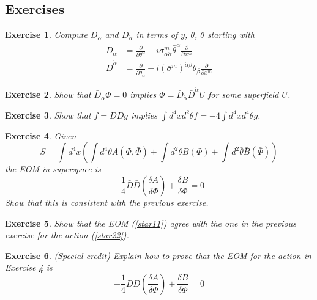 \documentclass[a4paper,12pt]{article}
\newtheorem{exe}{Exercise}
\numberwithin{equation}{section}
\numberwithin{exe}{section}
\newcommand{\p}{{\partial}}
\newcommand{\Db}{{\bar D}}
\renewcommand{\a}{{\alpha}}
\newcommand{\ad}{{\dot\alpha}}
\renewcommand{\b}{{\beta}}
\renewcommand{\d}{{\delta}}
\newcommand{\s}{{\sigma}}
\renewcommand{\sb}{{\bar\sigma}}
\renewcommand{\t}{{\theta}}
\newcommand{\tb}{{\bar\theta}}
\newcommand{\Phib}{{\bar \Phi}}
\begin{document}
\subsection{Exercises}

	\begin{exe}
	Compute $D_\a$ and $\bar D_\ad$ in terms of $y$, $\t$, $\tb$ starting with
		\begin{align}
		D_\a & = \frac{\p}{\p\t^\a} + i \s^m_{\a\ad} \tb^\ad \frac{\p}{\p x^m} \\
		\bar D^\ad & = \frac{\p}{\p\tb_\ad} + i(\sb^m)^{\ad\b} \t_\b \frac{\p}{\p x^m}
		\end{align}
	\end{exe}

	\begin{exe}
	Show that $\bar D_\ad \Phi = 0$ implies $\Phi = \bar D_\ad \bar D^\ad U$ for some superfield $U$.
	\end{exe}

	\begin{exe}
	Show that $f = \Db\Db g$ implies $\int d^4 x d^2 \t f = -4 \int d^4 x d^4\t g$.
	\end{exe}

	\begin{exe}\label{exe4}
	Given
		\begin{equation}
		S = \int d^4 x\left( \int d^4\t A(\Phi,\Phib) + \int d^2\t B(\Phi) + \int d^2\tb \bar B(\Phib) \right)
		\end{equation}
	the EOM in superspace is
		\begin{equation}
		-\frac14 \Db\Db\left( \frac{\d A}{\d \Phi} \right) + \frac{\d B}{\d \Phi} = 0
		\end{equation}
	Show that this is consistent with the previous exercise.
	\end{exe}

	\begin{exe}
	Show that the EOM (\ref{star11}) agree with the one in the previous exercise for the action (\ref{star22}).
	\end{exe}

	\begin{exe}
	(Special credit) Explain how to prove that the EOM for the action in Exercise \ref{exe4} is
		\begin{equation}
		-\frac14 \Db\Db\left( \frac{\d A}{\d \Phi} \right) + \frac{\d B}{\d \Phi} = 0
		\end{equation}
	\end{exe}


\newpage
\end{document}
